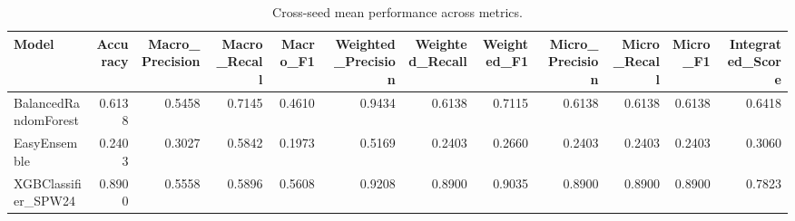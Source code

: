 \begin{table}[t]
\centering
\begin{tabular}{lrrrrrrrrrrr}
\toprule
Model & Accuracy & Macro_Precision & Macro_Recall & Macro_F1 & Weighted_Precision & Weighted_Recall & Weighted_F1 & Micro_Precision & Micro_Recall & Micro_F1 & Integrated_Score \\
\midrule
BalancedRandomForest & 0.6138 & 0.5458 & 0.7145 & 0.4610 & 0.9434 & 0.6138 & 0.7115 & 0.6138 & 0.6138 & 0.6138 & 0.6418 \\
EasyEnsemble & 0.2403 & 0.3027 & 0.5842 & 0.1973 & 0.5169 & 0.2403 & 0.2660 & 0.2403 & 0.2403 & 0.2403 & 0.3060 \\
XGBClassifier_SPW24 & 0.8900 & 0.5558 & 0.5896 & 0.5608 & 0.9208 & 0.8900 & 0.9035 & 0.8900 & 0.8900 & 0.8900 & 0.7823 \\
\bottomrule
\end{tabular}
\caption{Cross-seed mean performance across metrics.}
\label{tab:cross_seed_mean}
\end{table}